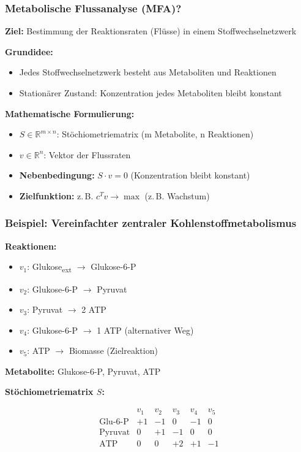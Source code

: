 
\begin{frame}
    \frametitle{Metabolische Flussanalyse (MFA)?}

\textbf{Ziel:} Bestimmung der Reaktionsraten (Flüsse) in einem Stoffwechselnetzwerk

\textbf{Grundidee:}
\begin{itemize}
  \item Jedes Stoffwechselnetzwerk besteht aus Metaboliten und Reaktionen
  \item Stationärer Zustand: Konzentration jedes Metaboliten bleibt konstant
\end{itemize}

\textbf{Mathematische Formulierung:}
\begin{itemize}
  \item $S \in \mathbb{R}^{m \times n}$: Stöchiometriematrix (m Metabolite, n Reaktionen)
  \item $v \in \mathbb{R}^{n}$: Vektor der Flussraten
  \item \textbf{Nebenbedingung:} $S \cdot v = 0$ (Konzentration bleibt konstant)
  \item \textbf{Zielfunktion:} z.\,B. $c^T v \rightarrow \max$ (z.\,B. Wachstum)
\end{itemize}
\end{frame}



\begin{frame}
    
    \frametitle{Beispiel: Vereinfachter zentraler Kohlenstoffmetabolismus}

\textbf{Reaktionen:}
\begin{itemize}
  \item $v_1$: Glukose\textsubscript{ext} $\rightarrow$ Glukose-6-P
  \item $v_2$: Glukose-6-P $\rightarrow$ Pyruvat
  \item $v_3$: Pyruvat $\rightarrow$ 2 ATP
  \item $v_4$: Glukose-6-P $\rightarrow$ 1 ATP (alternativer Weg)
  \item $v_5$: ATP $\rightarrow$ Biomasse (Zielreaktion)
\end{itemize}

\vspace{0.5em}
\textbf{Metabolite:} Glukose-6-P, Pyruvat, ATP

\vspace{0.5em}
\textbf{Stöchiometriematrix $S$:}

\[
\begin{array}{c|ccccc}
 & v_1 & v_2 & v_3 & v_4 & v_5 \\
\hline
\text{Glu-6-P} & +1 & -1 &  0 & -1 & 0 \\
\text{Pyruvat} &  0 & +1 & -1 &  0 & 0 \\
\text{ATP}     &  0 &  0 & +2 & +1 & -1 \\
\end{array}
\]
\end{frame}

